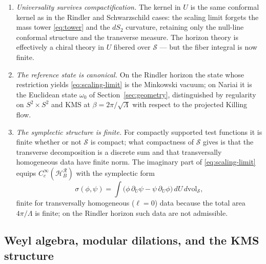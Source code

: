 \documentclass[11pt]{article}
\newcommand{\Nariai}{Nariai}
\begin{document}
\begin{enumerate}
\item \emph{Universality survives compactification.} The kernel in $U$ is the same conformal kernel as in the Rindler and Schwarzschild cases: the scaling limit forgets the mass tower \eqref{eq:tower} and the $dS_2$ curvature, retaining only the null-line conformal structure and the transverse measure. The horizon theory is effectively a chiral theory in $U$ fibered over $\mathcal{S}$ --- but the fiber integral is now finite.

\item \emph{The reference state is canonical.} On the Rindler horizon the state whose restriction yields \eqref{eq:scaling-limit} is the Minkowski vacuum; on \Nariai{} it is the Euclidean state $\omega_0$ of Section~\ref{sec:geometry}, distinguished by regularity on $S^2\times S^2$ and KMS at $\beta = 2\pi/\sqrt{\Lambda}$ with respect to the projected Killing flow.

\item \emph{The symplectic structure is finite.} For compactly supported test functions it is finite whether or not $\mathcal{S}$ is compact; what compactness of $\mathcal{S}$ gives is that the transverse decomposition is a discrete sum and that transversally homogeneous data have finite norm. The imaginary part of \eqref{eq:scaling-limit} equips $C^\infty_c(\mathcal{H}_B^{\mathcal{R}})$ with the symplectic form
\begin{equation}
\sigma(\phi,\psi)
= \int \big(\phi\,\partial_U \psi - \psi\,\partial_U \phi\big)\, dU\, d\mathrm{vol}_{\mathcal{S}},
\label{eq:symplectic}
\end{equation}
finite for transversally homogeneous ($\ell = 0$) data because the total area $4\pi/\Lambda$ is finite; on the Rindler horizon such data are not admissible.

\end{enumerate}


\subsection{Weyl algebra, modular dilations, and the KMS structure}
\end{document}

